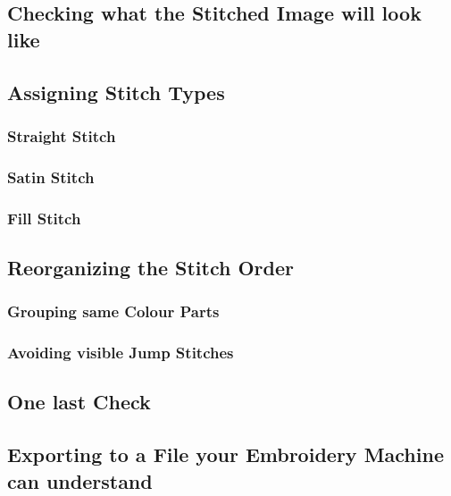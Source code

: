 \documentclass{article}
\begin{document}
        \subsection{Checking what the Stitched Image will look like}
        
        \subsection{Assigning Stitch Types}
            \subsubsection{Straight Stitch}
            \subsubsection{Satin Stitch}
            \subsubsection{Fill Stitch}
        
        \subsection{Reorganizing the Stitch Order}
            \subsubsection{Grouping same Colour Parts}
            \subsubsection{Avoiding visible Jump Stitches}
        
        \subsection{One last Check}
        
        \subsection{Exporting to a File your Embroidery Machine can understand}
\end{document}
